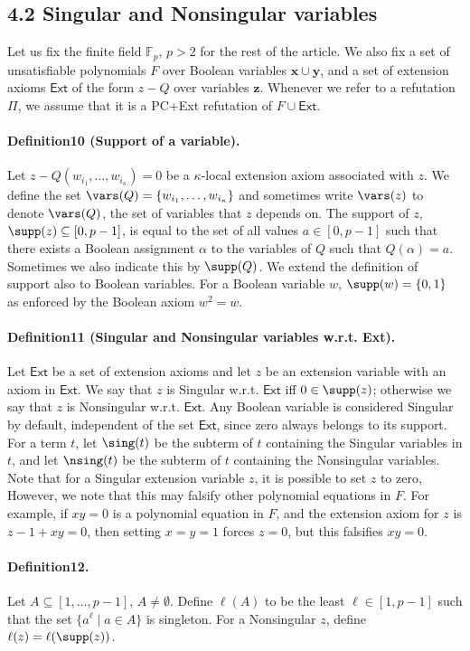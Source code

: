 \subsection*{4.2 Singular and Nonsingular variables}
Let us fix the finite field $\mathbb F_p$, $p>2$ for the rest of the article. We also fix a set of unsatisfiable polynomials $F$ over Boolean variables $\mathbf x\cup\mathbf y$, and a set of extension axioms $\mathsf{Ext}$ of the form $z-Q$ over variables $\mathbf z$. Whenever we refer to a refutation $\Pi$, we assume that it is a PC+Ext refutation of $F\cup\mathsf{Ext}$.
\paragraph{Definition10 (Support of a variable).}
Let $z-Q(w_{i_1},\ldots,w_{i_{\kappa}})=0$ be a $\kappa$-local extension axiom associated with $z$. We define the set $\vars(Q)=\{w_{i_1},\ldots,w_{i_{\kappa}}\}$ and sometimes write $\vars(z)$ to denote $\vars(Q)$, the set of variables that $z$ depends on. The support of $z$, $\supp(z)\subseteq[0,p-1]$, is equal to the set of all values $a\in[0,p-1]$ such that there exists a Boolean assignment $\alpha$ to the variables of $Q$ such that $Q(\alpha)=a$. Sometimes we also indicate this by $\supp(Q)$.
We extend the definition of support also to Boolean variables. For a Boolean variable $w$, $\supp(w)=\{0,1\}$ as enforced by the Boolean axiom $w^2=w$.
\paragraph{Definition11 (Singular and Nonsingular variables w.r.t. Ext).}
Let $\mathsf{Ext}$ be a set of extension axioms and let $z$ be an extension variable with an axiom in $\mathsf{Ext}$. We say that $z$ is Singular w.r.t. $\mathsf{Ext}$ iff $0\in\supp(z)$; otherwise we say that $z$ is Nonsingular w.r.t. $\mathsf{Ext}$. Any Boolean variable is considered Singular by default, independent of the set $\mathsf{Ext}$, since zero always belongs to its support. For a term $t$, let $\sing(t)$ be the subterm of $t$ containing the Singular variables in $t$, and let $\nsing(t)$ be the subterm of $t$ containing the Nonsingular variables.
Note that for a Singular extension variable $z$, it is possible to set $z$ to zero, However, we note that this may falsify other polynomial equations in $F$. For example, if $xy=0$ is a polynomial equation in $F$, and the extension axiom for $z$ is $z-1+xy=0$, then setting $x=y=1$ forces $z=0$, but this falsifies $xy=0$.
\paragraph{Definition12.} Let $A\subseteq[1,\ldots,p-1]$, $A\neq\emptyset$. Define $\ell(A)$ to be the least $\ell\in[1,p-1]$ such that the set $\{a^{\ell}\mid a\in A\}$ is singleton. For a Nonsingular $z$, define $\ell(z)=\ell(\supp(z))$.
